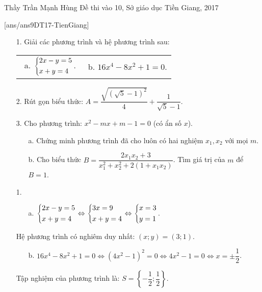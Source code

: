 
\begin{name}
{Thầy  Trần Mạnh Hùng}
{Đề thi vào 10, Sở giáo dục Tiền Giang, 2017}
\end{name}
\setcounter{ex}{0}
[ans/ans9DT17-TienGiang]
\begin{ex}%
    \hfill
    \begin{enumerate}
        \item[1.] Giải các phương trình và hệ phương trình sau:\\
        \begin{tabular}{m{} m{}}
         \ a. $\left\{\begin{aligned}& 2x-y=5\\ &x+y=4\end{aligned}\right.$.
        &
         \ b. $16x^4-8x^2+1=0$.
		\end{tabular}
        \item[2.] Rút gọn biểu thức: \hspace{1cm} $A=\dfrac{\sqrt{\left(\sqrt{5}-1\right)^2}}{4}+\dfrac{1}{\sqrt{5}-1}$.
        \item[3.] Cho phương trình: $x^2-mx+m-1=0$ (có ẩn số $x$).
        \begin{itemize}
        \item[a.] Chứng minh phương trình đã cho luôn có hai nghiệm $x_1,x_2$ với mọi $m$.
		\item[b.] Cho biểu thức $B=\dfrac{2x_1x_2+3}{x_1^2+x_2^2+2\left(1+x_1x_2\right)}$. Tìm giá trị của $m$ để $B=1$. 
        \end{itemize}
    \end{enumerate}
\loigiai
    {
    \begin{enumerate}
        \item[1.] 
        \begin{itemize}
        \item[a.] 
       $\left\{\begin{aligned}& 2x-y=5\\ &x+y=4\end{aligned}\right.\Leftrightarrow \left\{\begin{aligned}& 3x=9\\&x+y=4\end{aligned}\right.\Leftrightarrow\left\{\begin{aligned}&x=3\\&y=1\end{aligned}\right.$.
       \end{itemize}
         Hệ phương trình có nghiêm duy nhất: $(x;y)=(3;1)$.
		\begin{itemize}        
        \item[b.]
        $16x^4-8x^2+1=0\Leftrightarrow \left(4x^2-1\right)^2=0\Leftrightarrow 4x^2-1=0\Leftrightarrow x=\pm\dfrac{1}{2}$.
        \end{itemize}
        Tập nghiệm của phương trình là: $S=\left\{-\dfrac{1}{2};\dfrac{1}{2}\right\}$.

\end{enumerate}}
\end{ex}
